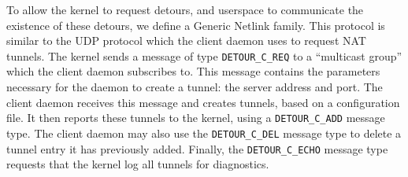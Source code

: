 \documentclass{cwru}
\begin{document}
To allow the kernel to request detours, and userspace to communicate the
existence of these detours, we define a Generic Netlink family. This protocol is
similar to the UDP protocol which the client daemon uses to request NAT tunnels.
The kernel sends a message of type \texttt{DETOUR\_C\_REQ} to a ``multicast
group'' which the client daemon subscribes to. This message contains the
parameters necessary for the daemon to create a tunnel: the server address and
port. The client daemon receives this message and creates tunnels, based on a
configuration file. It then reports these tunnels to the kernel, using a
\texttt{DETOUR\_C\_ADD} message type. The client daemon may also use the
\texttt{DETOUR\_C\_DEL} message type to delete a tunnel entry it has previously
added. Finally, the \texttt{DETOUR\_C\_ECHO} message type requests that the
kernel log all tunnels for diagnostics.

\backmatter
\appendix



\end{document}
